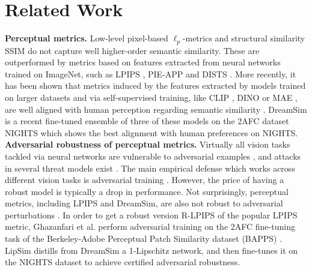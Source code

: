 \section{Related Work}
\label{sec:related}

\textbf{Perceptual metrics.}
Low-level pixel-based $\ell_p$-metrics and structural similarity SSIM \cite{wang2004image} do not capture well higher-order semantic similarity.
These are outperformed by metrics based on features extracted from neural networks trained on ImageNet, such as
LPIPS \cite{zhang2018unreasonable}, 
PIE-APP \cite{prashnani2018pieapp} and DISTS \cite{Ding_2020}. 
More recently, it has been shown that metrics induced by the features extracted by models trained on larger datasets and via self-supervised training, like CLIP \cite{radford2021clip}, DINO \cite{caron2021emerging} or MAE \cite{he2021masked}, are well aligned with human perception regarding semantic similarity \cite{fu2023learning}. 
DreamSim \cite{fu2023learning} is a recent fine-tuned ensemble of three of these models on the 2AFC dataset NIGHTS which shows the best alignment with human preferences on NIGHTS.
\\

\textbf{Adversarial robustness of perceptual metrics.}
Virtually all vision tasks tackled via neural networks are vulnerable to adversarial examples \cite{Szegedy2014AdvExamples}, 
and attacks in several threat models exist \cite{Carlini2017DetectionBypassing,Croce2020Autoattack,Laidlaw2019ThreatModelPerceptibility}.
The main empirical defense which works across different vision tasks is adversarial training \cite{Madry2018AT}. However, the price of having a robust model is typically a drop in performance.
Not surprisingly, perceptual metrics, including LPIPS and DreamSim, are also not robust to adversarial perturbations \cite{ghazanfari2023rlpips,ghazanfari2023lipsim,ghildyal2023attacking}.
In order to get a robust version R-LPIPS of the popular LPIPS metric, Ghazanfari et al. \cite{ghazanfari2023rlpips} perform adversarial training on the 2AFC 
fine-tuning task of the Berkeley-Adobe Perceptual Patch Similarity dataset (BAPPS) \cite{zhang2018unreasonable}.
LipSim \cite{ghazanfari2023lipsim} distills from DreamSim \cite{fu2023learning} a 1-Lipschitz network, and then fine-tunes it on the NIGHTS dataset \cite{fu2023learning}
to achieve certified adversarial robustness.
\\

